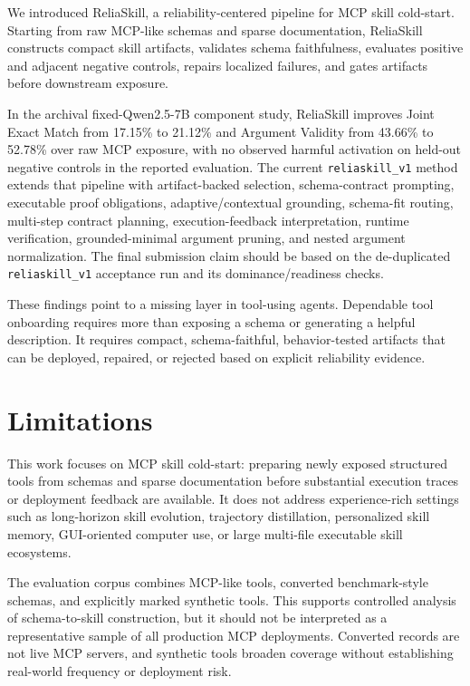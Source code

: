 \documentclass[11pt]{article}
\newcommand{\method}{ReliaSkill}
\begin{document}
We introduced \method{}, a reliability-centered pipeline for MCP skill cold-start. Starting from raw MCP-like schemas and sparse documentation, \method{} constructs compact skill artifacts, validates schema faithfulness, evaluates positive and adjacent negative controls, repairs localized failures, and gates artifacts before downstream exposure.

In the archival fixed-Qwen2.5-7B component study, \method{} improves Joint Exact Match from 17.15\% to 21.12\% and Argument Validity from 43.66\% to 52.78\% over raw MCP exposure, with no observed harmful activation on held-out negative controls in the reported evaluation. The current \texttt{reliaskill\_v1} method extends that pipeline with artifact-backed selection, schema-contract prompting, executable proof obligations, adaptive/contextual grounding, schema-fit routing, multi-step contract planning, execution-feedback interpretation, runtime verification, grounded-minimal argument pruning, and nested argument normalization. The final submission claim should be based on the de-duplicated \texttt{reliaskill\_v1} acceptance run and its dominance/readiness checks.

These findings point to a missing layer in tool-using agents. Dependable tool onboarding requires more than exposing a schema or generating a helpful description. It requires compact, schema-faithful, behavior-tested artifacts that can be deployed, repaired, or rejected based on explicit reliability evidence.

\section{Limitations}
\label{sec:limitations}

This work focuses on MCP skill cold-start: preparing newly exposed structured tools from schemas and sparse documentation before substantial execution traces or deployment feedback are available. It does not address experience-rich settings such as long-horizon skill evolution, trajectory distillation, personalized skill memory, GUI-oriented computer use, or large multi-file executable skill ecosystems.

The evaluation corpus combines MCP-like tools, converted benchmark-style schemas, and explicitly marked synthetic tools. This supports controlled analysis of schema-to-skill construction, but it should not be interpreted as a representative sample of all production MCP deployments. Converted records are not live MCP servers, and synthetic tools broaden coverage without establishing real-world frequency or deployment risk.
\end{document}
